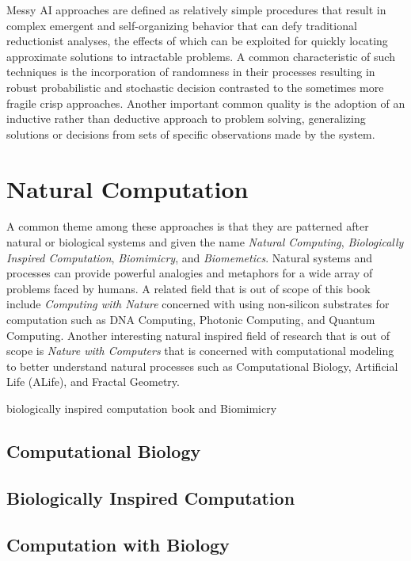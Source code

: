 \documentclass[a4paper, 11pt]{article}
\begin{document}
Messy AI approaches are defined as relatively simple procedures that result in complex emergent and self-organizing behavior that can defy traditional reductionist analyses, the effects of which can be exploited for quickly locating approximate solutions to intractable problems. A common characteristic of such techniques is the incorporation of randomness in their processes resulting in robust probabilistic and stochastic decision contrasted to the sometimes more fragile crisp approaches. Another important common quality is the adoption of an inductive rather than deductive approach to problem solving, generalizing solutions or decisions from sets of specific observations made by the system.


% 
% 
\section{Natural Computation}
\label{sec:natural_computation}
A common theme among these approaches is that they are patterned after natural or biological systems and given the name \emph{Natural Computing}, \emph{Biologically Inspired Computation}, \emph{Biomimicry}, and \emph{Biomemetics}. Natural systems and processes can provide powerful analogies and metaphors for a wide array of problems faced by humans. A related field that is out of scope of this book include \emph{Computing with Nature} concerned with using non-silicon substrates for computation such as DNA Computing, Photonic Computing, and Quantum Computing. Another interesting natural inspired field of research that is out of scope is \textit{Nature with Computers} that is concerned with computational modeling to better understand natural processes such as Computational Biology, Artificial Life (ALife), and Fractal Geometry.

biologically inspired computation book \cite{Castro2005} and \cite{Forbes2005}
Biomimicry \cite{Benyus1998}

\subsection{Computational Biology}

\subsection{Biologically Inspired Computation}

\subsection{Computation with Biology}
\end{document}

